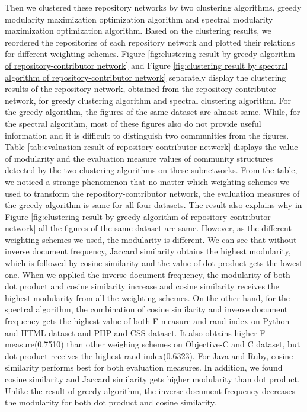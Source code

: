 \documentclass[12pt,oneside,final]{vlsithesis}
\begin{document}
	Then we clustered these repository networks by two clustering algorithms, greedy modularity maximization optimization algorithm and spectral modularity maximization optimization algorithm. Based on the clustering results, we reordered the repositories of each repository network and plotted their relations for different weighting schemes. Figure \ref{fig:clustering result by greedy algorithm of repository-contributor network} and Figure \ref{fig:clustering result by spectral algorithm of repository-contributor network} separately display the clustering results of the repository network, obtained from the repository-contributor network, for greedy clustering algorithm and spectral clustering algorithm.  For the greedy algorithm, the figures of the same dataset are almost same. While, for the spectral algorithm, most of these figures also do not provide useful information and it is difficult to distinguish two communities from the figures. Table \ref{tab:evaluation result of repository-contributor network} displays the value of modularity and the evaluation measure values of community structures detected by the two clustering algorithms on these subnetworks. From the table, we noticed a strange phenomenon that no matter which weighting schemes we used to transform the repository-contributor network, the evaluation measures of the greedy algorithm is same for all four datasets. The result also explains why in Figure \ref{fig:clustering result by greedy algorithm of repository-contributor network} all the figures of the same dataset  are same. However, as the different weighting schemes we used, the modularity is different. We can see that without inverse document frequency, Jaccard similarity obtains the highest modularity, which is followed by cosine similarity and the value of dot product gets the lowest one. When we applied the inverse document frequency, the modularity of both dot product and cosine similarity increase and cosine similarity receives the highest modularity from all the weighting schemes. On the other hand, for the spectral algorithm, the combination of cosine similarity and inverse document frequency gets the highest value of both F-measure and rand index on Python and HTML dataset and PHP and CSS dataset. It also obtains higher F-measure(0.7510) than other weighing schemes on Objective-C and C dataset, but dot product receives the highest rand index(0.6323). For Java and Ruby, cosine similarity performs best for both evaluation measures. In addition, we found cosine similarity and Jaccard similarity gets higher modularity than dot product. Unlike the result of greedy algorithm, the inverse document frequency decreases the modularity for both dot product and cosine similarity. 
\end{document}
